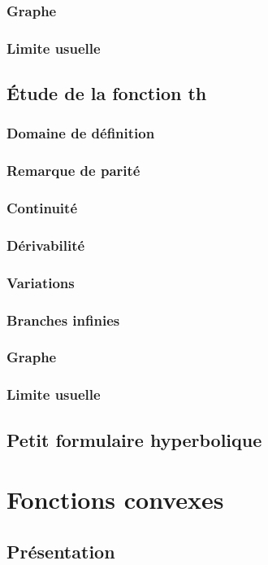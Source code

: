 \documentclass[12pt,a4paper,french]{book}
\begin{document}
		\subsection{Graphe}
		\subsection{Limite usuelle}
	\section{Étude de la fonction th}
		\subsection{Domaine de définition}
		\subsection{Remarque de parité}
		\subsection{Continuité}
		\subsection{Dérivabilité}
		\subsection{Variations}
		\subsection{Branches infinies}
		\subsection{Graphe}
		\subsection{Limite usuelle}
	\section{Petit formulaire hyperbolique}
	
\chapter{Fonctions convexes}
	\section{Présentation}
\end{document}
